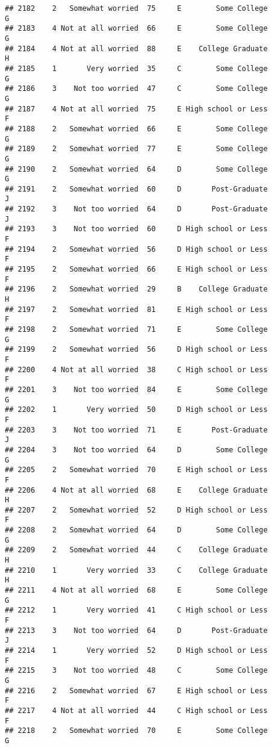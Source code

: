 \documentclass[
]{article}
\begin{document}
\begin{verbatim}
## 2182    2   Somewhat worried  75     E        Some College         G
## 2183    4 Not at all worried  66     E        Some College         G
## 2184    4 Not at all worried  88     E    College Graduate         H
## 2185    1       Very worried  35     C        Some College         G
## 2186    3    Not too worried  47     C        Some College         G
## 2187    4 Not at all worried  75     E High school or Less         F
## 2188    2   Somewhat worried  66     E        Some College         G
## 2189    2   Somewhat worried  77     E        Some College         G
## 2190    2   Somewhat worried  64     D        Some College         G
## 2191    2   Somewhat worried  60     D       Post-Graduate         J
## 2192    3    Not too worried  64     D       Post-Graduate         J
## 2193    3    Not too worried  60     D High school or Less         F
## 2194    2   Somewhat worried  56     D High school or Less         F
## 2195    2   Somewhat worried  66     E High school or Less         F
## 2196    2   Somewhat worried  29     B    College Graduate         H
## 2197    2   Somewhat worried  81     E High school or Less         F
## 2198    2   Somewhat worried  71     E        Some College         G
## 2199    2   Somewhat worried  56     D High school or Less         F
## 2200    4 Not at all worried  38     C High school or Less         F
## 2201    3    Not too worried  84     E        Some College         G
## 2202    1       Very worried  50     D High school or Less         F
## 2203    3    Not too worried  71     E       Post-Graduate         J
## 2204    3    Not too worried  64     D        Some College         G
## 2205    2   Somewhat worried  70     E High school or Less         F
## 2206    4 Not at all worried  68     E    College Graduate         H
## 2207    2   Somewhat worried  52     D High school or Less         F
## 2208    2   Somewhat worried  64     D        Some College         G
## 2209    2   Somewhat worried  44     C    College Graduate         H
## 2210    1       Very worried  33     C    College Graduate         H
## 2211    4 Not at all worried  68     E        Some College         G
## 2212    1       Very worried  41     C High school or Less         F
## 2213    3    Not too worried  64     D       Post-Graduate         J
## 2214    1       Very worried  52     D High school or Less         F
## 2215    3    Not too worried  48     C        Some College         G
## 2216    2   Somewhat worried  67     E High school or Less         F
## 2217    4 Not at all worried  44     C High school or Less         F
## 2218    2   Somewhat worried  70     E        Some College         G

\end{verbatim}
\end{document}
